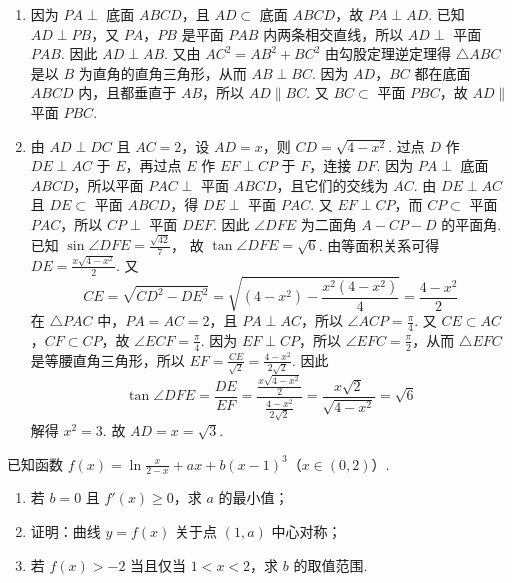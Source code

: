 \begin{solution}
\begin{enumerate}
\item 因为 \(PA\perp\) 底面 \(ABCD\)，且 \(AD\subset\) 底面 \(ABCD\)，故 \(PA\perp AD\).
已知 \(AD\perp PB\)，又 \(PA\)，\(PB\) 是平面 \(PAB\) 内两条相交直线，所以 \(AD\perp\) 平面 \(PAB\).
因此 \(AD\perp AB\). 又由
\(AC^2=AB^2+BC^2\)
由勾股定理逆定理得 \(\triangle ABC\) 是以 \(B\) 为直角的直角三角形，从而 \(AB\perp BC\).
因为 \(AD\)，\(BC\) 都在底面 \(ABCD\) 内，且都垂直于 \(AB\)，所以 \(AD\parallel BC\). 又 \(BC\subset\) 平面 \(PBC\)，故 \(AD\parallel\) 平面 \(PBC\).

\item 由 \(AD\perp DC\) 且 \(AC=2\)，设 \(AD=x\)，则
\(CD=\sqrt{4-x^2}\).
过点 \(D\) 作 \(DE\perp AC\) 于 \(E\)，再过点 \(E\) 作 \(EF\perp CP\) 于 \(F\)，连接 \(DF\).
因为 \(PA\perp\) 底面 \(ABCD\)，所以平面 \(PAC\perp\) 平面 \(ABCD\)，且它们的交线为 \(AC\). 由 \(DE\perp AC\) 且 \(DE\subset\) 平面 \(ABCD\)，得 \(DE\perp\) 平面 \(PAC\).
又 \(EF\perp CP\)，而 \(CP\subset\) 平面 \(PAC\)，所以 \(CP\perp\) 平面 \(DEF\). 因此 \(\angle DFE\) 为二面角 \(A-CP-D\) 的平面角. 已知
\(\sin\angle DFE=\frac{\sqrt{42}}{7}\)，
故
\(\tan\angle DFE=\sqrt6\).
由等面积关系可得
\(DE=\frac{x\sqrt{4-x^2}}{2}\).
又
\[
CE=\sqrt{CD^2-DE^2}=\sqrt{(4-x^2)-\frac{x^2(4-x^2)}{4}}=\frac{4-x^2}{2}
\]
在 \(\triangle PAC\) 中，\(PA=AC=2\)，且 \(PA\perp AC\)，所以 \(\angle ACP=\frac{\pi}{4}\). 又 \(CE\subset AC\)，\(CF\subset CP\)，故 \(\angle ECF=\frac{\pi}{4}\). 因为 \(EF\perp CP\)，所以 \(\angle EFC=\frac{\pi}{2}\)，从而 \(\triangle EFC\) 是等腰直角三角形，所以
\(EF=\frac{CE}{\sqrt2}=\frac{4-x^2}{2\sqrt2}\).
因此
\[
\tan\angle DFE=\frac{DE}{EF}=\frac{\frac{x\sqrt{4-x^2}}{2}}{\frac{4-x^2}{2\sqrt2}}=\frac{x\sqrt2}{\sqrt{4-x^2}}=\sqrt6
\]
解得
\(x^2=3\).
故
\(AD=x=\sqrt3\).
\end{enumerate}
\end{solution}

\begin{problem}
已知函数
\(f(x)=\ln\frac{x}{2-x}+ax+b(x-1)^3\)（\(x\in(0,2)\)）.
\begin{enumerate}
\item 若 \(b=0\) 且 \(f'(x)\ge0\)，求 \(a\) 的最小值；
\item 证明：曲线 \(y=f(x)\) 关于点 \((1,a)\) 中心对称；
\item 若 \(f(x)>-2\) 当且仅当 \(1<x<2\)，求 \(b\) 的取值范围.
\end{enumerate}
\end{problem}

